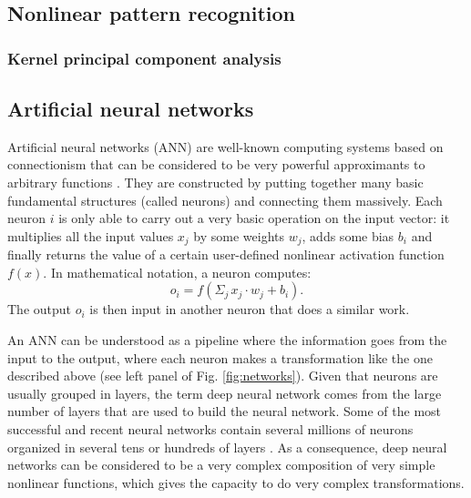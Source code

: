 \subsection{Nonlinear pattern recognition}
\subsubsection{Kernel principal component analysis}

\subsection{Artificial neural networks}
Artificial neural networks (ANN) are well-known computing systems based on connectionism
that can be considered to be very powerful approximants to arbitrary functions \citep{B96}.
They are constructed by putting together many basic fundamental structures (called neurons)
and connecting them massively. Each neuron $i$ is only able to carry out a very basic operation
on the input vector: it multiplies all the input values $x_j$ by some weights $w_j$, 
adds some bias $b_i$ and finally returns the value of a certain user-defined
nonlinear activation function $f(x)$. In mathematical notation, a neuron computes: 
\begin{equation}
o_i = f(\Sigma_j\,x_j\cdot w_j + b_i).
\end{equation}
The output $o_i$ is then input in another neuron that does a similar work.
 
An ANN can be understood as a pipeline where the information goes from the input to the output, 
where each neuron makes a transformation like the one described above (see left panel of Fig. 
\ref{fig:networks}). Given that neurons are usually grouped in layers, the term deep neural network 
comes from the large number of layers that are used to build the neural network. Some of 
the most successful and recent neural networks contain several millions of neurons organized in
several tens or hundreds of layers \cite{veryDeep2014}. As a consequence, deep neural networks can 
be considered to be a very complex composition of very simple nonlinear functions, which gives 
the capacity to do very complex transformations.

